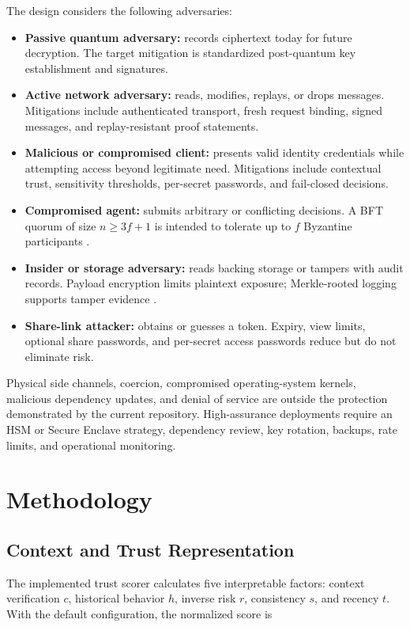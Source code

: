 \documentclass[10pt]{article}
\let\cite\citep
\begin{document}
The design considers the following adversaries:

\begin{itemize}
\item \textbf{Passive quantum adversary:} records ciphertext today for future decryption. The target mitigation is standardized post-quantum key establishment and signatures.
\item \textbf{Active network adversary:} reads, modifies, replays, or drops messages. Mitigations include authenticated transport, fresh request binding, signed messages, and replay-resistant proof statements.
\item \textbf{Malicious or compromised client:} presents valid identity credentials while attempting access beyond legitimate need. Mitigations include contextual trust, sensitivity thresholds, per-secret passwords, and fail-closed decisions.
\item \textbf{Compromised agent:} submits arbitrary or conflicting decisions. A BFT quorum of size $n \geq 3f+1$ is intended to tolerate up to $f$ Byzantine participants \cite{pbft}.
\item \textbf{Insider or storage adversary:} reads backing storage or tampers with audit records. Payload encryption limits plaintext exposure; Merkle-rooted logging supports tamper evidence \cite{merkle1989}.
\item \textbf{Share-link attacker:} obtains or guesses a token. Expiry, view limits, optional share passwords, and per-secret access passwords reduce but do not eliminate risk.
\end{itemize}

Physical side channels, coercion, compromised operating-system kernels, malicious dependency updates, and denial of service are outside the protection demonstrated by the current repository. High-assurance deployments require an HSM or Secure Enclave strategy, dependency review, key rotation, backups, rate limits, and operational monitoring.

\section*{Methodology}

\subsection*{Context and Trust Representation}

The implemented trust scorer calculates five interpretable factors: context verification $c$, historical behavior $h$, inverse risk $r$, consistency $s$, and recency $t$. With the default configuration, the normalized score is
\end{document}
